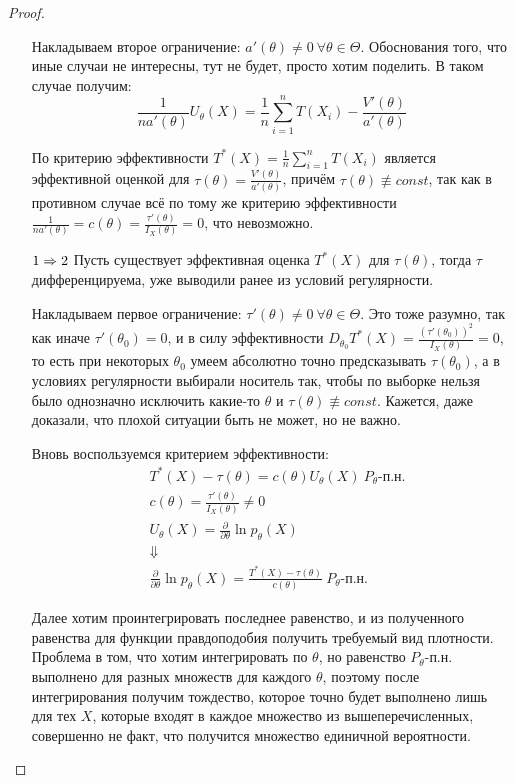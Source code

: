 \begin{proof}
\begin{itemize}
        Накладываем второе ограничение: $a'(\theta) \neq 0 \ \forall \theta \in \Theta$. Обоснования того, что иные случаи не интересны, тут не будет, просто хотим поделить. В таком случае получим:
        \[
            \frac{1}{n a'(\theta)} U_\theta(X) = \frac{1}{n} \sum_{i=1}^n T(X_i) - \frac{V'(\theta)}{a'(\theta)}
        \]

        По критерию эффективности $T^*(X) = \frac{1}{n} \sum_{i=1}^n T(X_i)$ является эффективной оценкой для $\tau(\theta) = \frac{V'(\theta)}{a'(\theta)}$, причём $\tau(\theta) \not\equiv const$, так как в противном случае всё по тому же критерию эффективности $\frac{1}{n a'(\theta)} = c(\theta) = \frac{\tau'(\theta)}{I_X(\theta)} = 0$, что невозможно.

        \item[$1 \Rightarrow 2$] Пусть существует эффективная оценка $T^*(X)$ для $\tau(\theta)$, тогда $\tau$ дифференцируема, уже выводили ранее из условий регулярности.

        Накладываем первое ограничение: $\tau'(\theta) \neq 0 \ \forall \theta \in \Theta$. Это тоже разумно, так как иначе $\tau'(\theta_0) = 0$, и в силу эффективности $D_{\theta_0} T^*(X) = \frac{(\tau'(\theta_0))^2}{I_X(\theta)} = 0$, то есть при некоторых $\theta_0$ умеем абсолютно точно предсказывать $\tau(\theta_0)$, а в условиях регулярности выбирали носитель так, чтобы по выборке нельзя было однозначно исключить какие-то $\theta$ и $\tau(\theta) \not\equiv const$. Кажется, даже доказали, что плохой ситуации быть не может, но не важно.

        Вновь воспользуемся критерием эффективности:
        \begin{align*}
            & T^*(X) - \tau(\theta) = c(\theta) U_\theta(X) \ P_\theta \text{-п.н.}
            \\
            & c(\theta) = \frac{\tau'(\theta)}{I_X(\theta)} \neq 0
            \\
            & U_\theta(X) = \frac{\partial}{\partial \theta} \ln p_\theta(X)
            \\
            & \Downarrow
            \\
            & \frac{\partial}{\partial \theta} \ln p_\theta(X) = \frac{T^*(X)-\tau(\theta)}{c(\theta)} \ P_\theta \text{-п.н.}
        \end{align*}

        Далее хотим проинтегрировать последнее равенство, и из полученного равенства для функции правдоподобия получить требуемый вид плотности. Проблема в том, что хотим интегрировать по $\theta$, но равенство $P_\theta \text{-п.н.}$ выполнено для разных множеств для каждого $\theta$, поэтому после интегрирования получим тождество, которое точно будет выполнено лишь для тех $X$, которые входят в каждое множество из вышеперечисленных, совершенно не факт, что получится множество единичной вероятности.


\end{itemize}
\end{proof}

